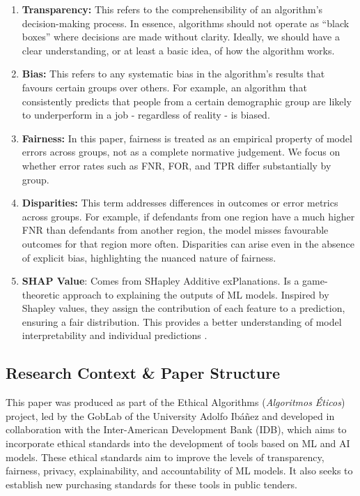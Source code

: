 \documentclass[fleqn,10pt]{wlscirep}
\begin{document}
\begin{enumerate}
    \item \textbf{Transparency:} This refers to the comprehensibility of an algorithm's decision-making process. In essence, algorithms should not operate as ``black boxes'' where decisions are made without clarity. Ideally, we should have a clear understanding, or at least a basic idea, of how the algorithm works.
    
    \item \textbf{Bias:} This refers to any systematic bias in the algorithm's results that favours certain groups over others. For example, an algorithm that consistently predicts that people from a certain demographic group are likely to underperform in a job - regardless of reality - is biased.
    
    \item \textbf{Fairness:} In this paper, fairness is treated as an empirical property of model errors across groups, not as a complete normative judgement. We focus on whether error rates such as FNR, FOR, and TPR differ substantially by group.

    \item \textbf{Disparities:} This term addresses differences in outcomes or error metrics across groups. For example, if defendants from one region have a much higher FNR than defendants from another region, the model misses favourable outcomes for that region more often. Disparities can arise even in the absence of explicit bias, highlighting the nuanced nature of fairness.

    \item \textbf{SHAP Value}: Comes from SHapley Additive exPlanations. Is a game-theoretic approach to explaining the outputs of ML models. Inspired by Shapley values, they assign the contribution of each feature to a prediction, ensuring a fair distribution. This provides a better understanding of model interpretability and individual predictions \cite{rozemberczki2022shapley}.
\end{enumerate}

\subsection{Research Context \& Paper Structure}

This paper was produced as part of the Ethical Algorithms (\textit{Algoritmos Éticos}) project, led by the GobLab of the University Adolfo Ibáñez and developed in collaboration with the Inter-American Development Bank (IDB), which aims to incorporate ethical standards into the development of tools based on ML and AI models. These ethical standards aim to improve the levels of transparency, fairness, privacy, explainability, and accountability of ML models. It also seeks to establish new purchasing standards for these tools in public tenders.
\end{document}
